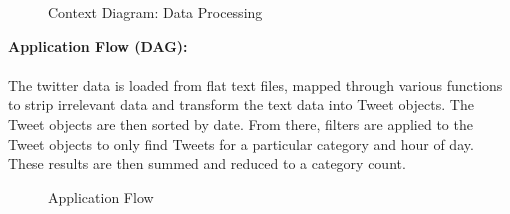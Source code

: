 \documentclass[12pt]{article} %
\begin{document}
	\begin{figure}[H] %
		\caption{Context Diagram: Data Processing}
		\label{fig:speciation}
	\end{figure}
	

	\textbf{Application Flow (DAG):}
	\\
	\
	\\
	The twitter data is loaded from flat text files, mapped through various functions to strip irrelevant data and transform the text data into Tweet objects. The Tweet objects are then sorted by date. From there, filters are applied to the Tweet objects to only find Tweets for a particular category and hour of day. These results are then summed and reduced to a category count.
	
		\begin{figure}[H] %
			\caption{Application Flow}
			\label{fig:speciation}
		\end{figure}
	
\end{document}

